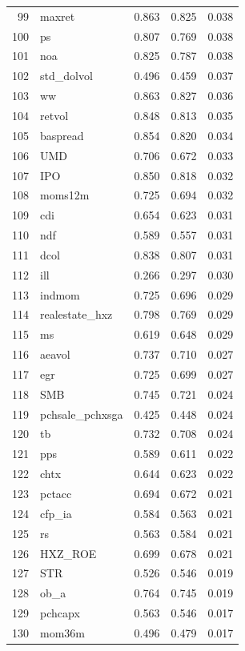\begin{footnotesize}
\begin{longtable}{rl|c|c|c}
		99 & maxret & 0.863 & 0.825 & 0.038 \\ 
		100 & ps & 0.807 & 0.769 & 0.038 \\ 
		101 & noa & 0.825 & 0.787 & 0.038 \\ 
		102 & std\_dolvol & 0.496 & 0.459 & 0.037 \\ 
		103 & ww & 0.863 & 0.827 & 0.036 \\ 
		104 & retvol & 0.848 & 0.813 & 0.035 \\ 
		105 & baspread & 0.854 & 0.820 & 0.034 \\ 
		106 & UMD & 0.706 & 0.672 & 0.033 \\ 
		107 & IPO & 0.850 & 0.818 & 0.032 \\ 
		108 & moms12m & 0.725 & 0.694 & 0.032 \\ 
		109 & cdi & 0.654 & 0.623 & 0.031 \\ 
		110 & ndf & 0.589 & 0.557 & 0.031 \\ 
		111 & dcol & 0.838 & 0.807 & 0.031 \\ 
		112 & ill & 0.266 & 0.297 & 0.030 \\ 
		113 & indmom & 0.725 & 0.696 & 0.029 \\ 
		114 & realestate\_hxz & 0.798 & 0.769 & 0.029 \\ 
		115 & ms & 0.619 & 0.648 & 0.029 \\ 
		116 & aeavol & 0.737 & 0.710 & 0.027 \\ 
		117 & egr & 0.725 & 0.699 & 0.027 \\ 
		118 & SMB & 0.745 & 0.721 & 0.024 \\ 
		119 & pchsale\_pchxsga & 0.425 & 0.448 & 0.024 \\ 
		120 & tb & 0.732 & 0.708 & 0.024 \\ 
		121 & pps & 0.589 & 0.611 & 0.022 \\ 
		122 & chtx & 0.644 & 0.623 & 0.022 \\ 
		123 & pctacc & 0.694 & 0.672 & 0.021 \\ 
		124 & cfp\_ia & 0.584 & 0.563 & 0.021 \\ 
		125 & rs & 0.563 & 0.584 & 0.021 \\ 
		126 & HXZ\_ROE & 0.699 & 0.678 & 0.021 \\ 
		127 & STR & 0.526 & 0.546 & 0.019 \\ 
		128 & ob\_a & 0.764 & 0.745 & 0.019 \\ 
		129 & pchcapx & 0.563 & 0.546 & 0.017 \\ 
		130 & mom36m & 0.496 & 0.479 & 0.017 \\ 

\end{longtable}
\end{footnotesize}
